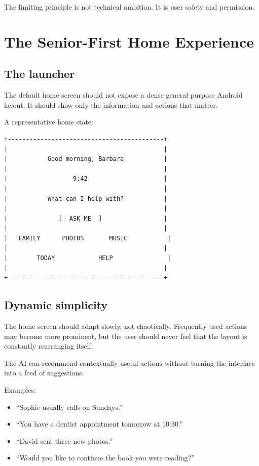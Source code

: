 \documentclass[11pt]{article}
\begin{document}
The limiting principle is not technical ambition. It is user safety and permission.

\section{The Senior-First Home Experience}

\subsection{The launcher}
The default home screen should not expose a dense general-purpose Android layout. It should show only the information and actions that matter.

A representative home state:

\begin{verbatim}
+-------------------------------------------+
|                                           |
|           Good morning, Barbara           |
|                                           |
|                  9:42                     |
|                                           |
|           What can I help with?           |
|                                           |
|              [  ASK ME  ]                 |
|                                           |
|   FAMILY      PHOTOS       MUSIC           |
|                                           |
|        TODAY            HELP               |
|                                           |
+-------------------------------------------+
\end{verbatim}

\subsection{Dynamic simplicity}
The home screen should adapt slowly, not chaotically. Frequently used actions may become more prominent, but the user should never feel that the layout is constantly rearranging itself.

The AI can recommend contextually useful actions without turning the interface into a feed of suggestions.

Examples:

\begin{itemize}[leftmargin=*]
    \item ``Sophie usually calls on Sundays.''
    \item ``You have a dentist appointment tomorrow at 10:30.''
    \item ``David sent three new photos.''
    \item ``Would you like to continue the book you were reading?''
\end{itemize}
\end{document}
